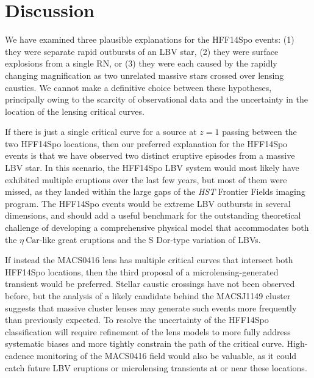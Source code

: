 \documentclass{article}
\providecommand\citep{\cite}
\def\etacar{\ensuremath{\eta~\mbox{Car}}\xspace}
\def\HST{{\it HST}\xspace}
\def\spock{HFF14Spo\xspace}
\def\macs0416{MACS0416\xspace}
\begin{document}

\section{Discussion}\label{sec:Discussion}

We have examined three plausible explanations for the \spock events:
(1) they were separate rapid outbursts of an LBV star, (2) they were
surface explosions from a single RN, or (3) they were each caused by
the rapidly changing magnification as two unrelated massive stars
crossed over lensing caustics. We cannot make a definitive choice
between these hypotheses, principally owing to the scarcity of
observational data and the uncertainty in the location of the
lensing critical curves.

If there is just a single critical curve for a source at $z=1$ passing
between the two \spock locations, then our preferred explanation for
the \spock events is that we have observed two distinct eruptive
episodes from a massive LBV star. In this scenario, the \spock LBV
system would most likely have exhibited multiple eruptions over the
last few years, but most of them were missed, as they landed within
the large gaps of the \HST Frontier Fields imaging program. The \spock
events would be extreme LBV outbursts in several dimensions, and
should add a useful benchmark for the outstanding theoretical
challenge of developing a comprehensive physical model that
accommodates both the \etacar-like great eruptions and the S Dor-type
variation of LBVs.

If instead the \macs0416 lens has multiple critical curves that
intersect both \spock locations, then the third proposal of a
microlensing-generated transient would be preferred.  Stellar caustic
crossings have not been observed before, but the analysis of a likely
candidate behind the MACSJ1149 cluster\citep{Kelly:2017} suggests that massive cluster
lenses may generate such events more frequently than previously
expected\citep{Kelly:2017, Diego:2017}. To resolve the uncertainty of
the \spock classification will require refinement of the lens models
to more fully address systematic biases and more tightly constrain the
path of the critical curve.  High-cadence monitoring of the \macs0416
field would also be valuable, as it could catch future LBV eruptions
or microlensing transients at or near these locations.

\end{document}
